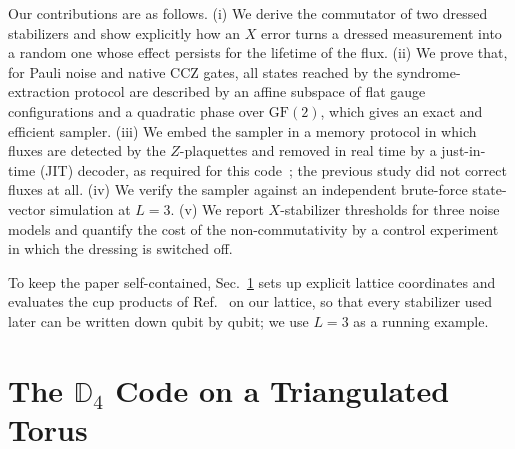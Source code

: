 \documentclass[a4paper]{article}
\newcommand{\GF}{\mathrm{GF}(2)}
\begin{document}
Our contributions are as follows. (i) We derive the commutator of two dressed stabilizers and show explicitly how an $X$ error turns a dressed measurement into a random one whose effect persists for the lifetime of the flux. (ii) We prove that, for Pauli noise and native CCZ gates, all states reached by the syndrome-extraction protocol are described by an affine subspace of flat gauge configurations and a quadratic phase over $\GF$, which gives an exact and efficient sampler. (iii) We embed the sampler in a memory protocol in which fluxes are detected by the $Z$-plaquettes and removed in real time by a just-in-time (JIT) decoder, as required for this code~\cite{kobayashi2025clifford,davydova2025knots}; the previous study did not correct fluxes at all. (iv) We verify the sampler against an independent brute-force state-vector simulation at $L=3$. (v) We report $X$-stabilizer thresholds for three noise models and quantify the cost of the non-commutativity by a control experiment in which the dressing is switched off.

To keep the paper self-contained, Sec.~\ref{sec:d4} sets up explicit lattice coordinates and evaluates the cup products of Ref.~\cite{kobayashi2025clifford} on our lattice, so that every stabilizer used later can be written down qubit by qubit; we use $L=3$ as a running example.

\section{The \texorpdfstring{$\mathbb{D}_4$}{D4} Code on a Triangulated Torus}
\label{sec:d4}
\end{document}
